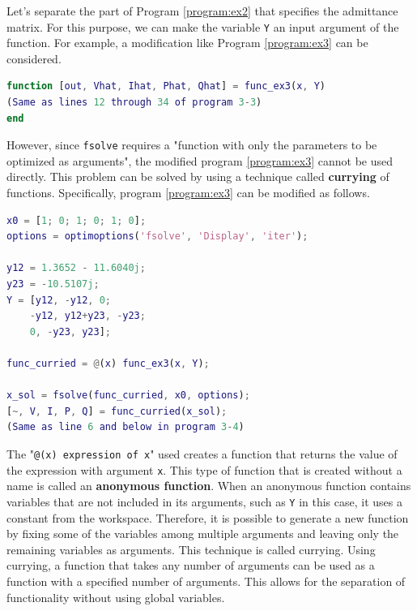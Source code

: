 \documentclass[graybox, envcountchap]{svmult}
\begin{document}
\begin{example}
Let's separate the part of Program \ref{program:ex2} that specifies the
admittance matrix. For this purpose, we can make the variable \verb|Y| an input
argument of the function. For example, a modification like Program
\ref{program:ex3} can be considered.

\begin{lstlisting}[language=Matlab, caption=function\_ex2.m, label={program:ex3}]
function [out, Vhat, Ihat, Phat, Qhat] = func_ex3(x, Y)
(Same as lines 12 through 34 of program 3-3)
end
\end{lstlisting}

However, since \verb|fsolve| requires a "function with only the parameters to be
optimized as arguments", the modified program \ref{program:ex3} cannot be used
directly. This problem can be solved by using a technique called
\textbf{currying} of functions. Specifically, program
\ref{program:ex3} can be modified as follows.


\begin{lstlisting}[language=Matlab, caption=main\_ex3.m, label={program:ex3_main}]
x0 = [1; 0; 1; 0; 1; 0];
options = optimoptions('fsolve', 'Display', 'iter');

y12 = 1.3652 - 11.6040j;
y23 = -10.5107j;
Y = [y12, -y12, 0;
    -y12, y12+y23, -y23;
    0, -y23, y23];

func_curried = @(x) func_ex3(x, Y);

x_sol = fsolve(func_curried, x0, options);
[~, V, I, P, Q] = func_curried(x_sol);
(Same as line 6 and below in program 3-4)
\end{lstlisting}

The "\verb|@(x) expression of x|" used creates a function that returns the value
of the expression with argument \verb|x|. This type of function that is created
without a name is called an \textbf{anonymous function}. When an anonymous
function contains variables that are not included in its arguments, such as
\verb|Y| in this case, it uses a constant from the workspace. Therefore, it is
possible to generate a new function by fixing some of the variables among
multiple arguments and leaving only the remaining variables as arguments. This
technique is called currying. Using currying, a function that takes any number
of arguments can be used as a function with a specified number of arguments.
This allows for the separation of functionality without using global variables.

\end{example}
\end{document}
